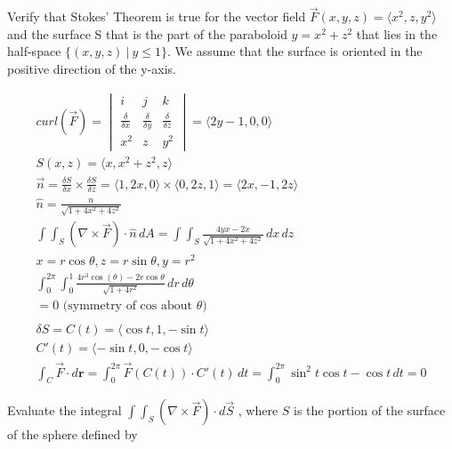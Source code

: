\documentclass[12pt]{exam}
\begin{document}
\begin{questions}
\question Verify that Stokes' Theorem is true for the vector field $\overrightarrow{F}(x, y, z) = \langle x^2, z, y^2 \rangle$ and the surface S that is the part of the paraboloid $y = x^2 + z^2$ that lies in the half-space $\{(x, y, z)\ |\ y \leq 1\}$. We assume that the surface is oriented in the positive direction of the y-axis.
    \begin{solution}
        \begin{gather*}
            curl(\overrightarrow{F}) = \begin{vmatrix}
                i & j & k \\
                \frac{\delta}{\delta x} & \frac{\delta}{\delta y} & \frac{\delta}{\delta z} \\
                x^2 & z & y^2
            \end{vmatrix} =\langle 2y - 1, 0, 0 \rangle\\
            S(x, z) = \langle x, x^2 + z^2, z \rangle \\
            \overrightarrow{n} = \frac{\delta S}{\delta x} \times \frac{\delta S}{\delta z} = \langle 1, 2x, 0 \rangle \times \langle 0, 2z, 1 \rangle = \langle 2x, -1, 2z \rangle \\
            \hat{n} = \frac{n}{\sqrt{1+4x^2 + 4z^2}} \\
            \int\int_S (\nabla \times \overrightarrow{F}) \cdot \hat{n}\,dA = \int \int_S \frac{4yx - 2x}{\sqrt{1+4x^2 + 4z^2}}\,dx\,dz \\
            x = r \cos \theta, z = r \sin \theta, y = r^2 \\
            \int_{0}^{2\pi} \int_{0}^{1} \frac{4r^3\cos(\theta) - 2r\cos\theta}{\sqrt{1+4r^2}}\,dr\,d\theta \\
            = 0 \text{ (symmetry of cos about $\theta$)} \\\\
            \delta S = C(t) = \langle \cos t, 1, -\sin t \rangle \\
            C'(t) = \langle -\sin t, 0, -\cos t \rangle \\
            \int_C \overrightarrow{F} \cdot d\mathbf{r} = \int_{0}^{2\pi} \overrightarrow{F}(C(t)) \cdot C'(t) \, dt = \int_{0}^{2\pi} \sin^2 t\cos t - \cos t \,dt = \boxed{0}
        \end{gather*}
    \end{solution}
    \clearpage
\question Evaluate the integral $\int \int_S (\nabla \times \overrightarrow{F}) \cdot d\overrightarrow{S}$ , where $S$ is the portion of the surface of the sphere defined by

\end{questions}
\end{document}
